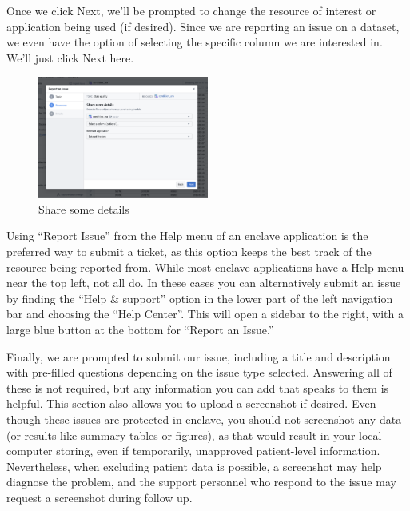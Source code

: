 \documentclass[
  letterpaper,
  DIV=11,
  numbers=noendperiod]{scrreprt}
\begin{document}
Once we click Next, we'll be prompted to change the resource of interest
or application being used (if desired). Since we are reporting an issue
on a dataset, we even have the option of selecting the specific column
we are interested in. We'll just click Next here.

\begin{figure}

{\centering \includegraphics[width=0.5\textwidth,height=\textheight]{chapters/images/support/image-05-issue-share-details.png}

}

\caption{\label{fig-support-issue-share-details}Share some details}

\end{figure}

\begin{tcolorbox}[enhanced jigsaw, rightrule=.15mm, colback=white, leftrule=.75mm, breakable, left=2mm, bottomtitle=1mm, opacityback=0, toprule=.15mm, colframe=quarto-callout-tip-color-frame, titlerule=0mm, toptitle=1mm, coltitle=black, title=\textcolor{quarto-callout-tip-color}{\faLightbulb}\hspace{0.5em}{Reporting Issues via Help Center}, bottomrule=.15mm, arc=.35mm, opacitybacktitle=0.6, colbacktitle=quarto-callout-tip-color!10!white]

Using ``Report Issue'' from the Help menu of an enclave application is
the preferred way to submit a ticket, as this option keeps the best
track of the resource being reported from. While most enclave
applications have a Help menu near the top left, not all do. In these
cases you can alternatively submit an issue by finding the ``Help \&
support'' option in the lower part of the left navigation bar and
choosing the ``Help Center''. This will open a sidebar to the right,
with a large blue button at the bottom for ``Report an Issue.''

\end{tcolorbox}

Finally, we are prompted to submit our issue, including a title and
description with pre-filled questions depending on the issue type
selected. Answering all of these is not required, but any information
you can add that speaks to them is helpful. This section also allows you
to upload a screenshot if desired. Even though these issues are
protected in enclave, you should not screenshot any data (or results
like summary tables or figures), as that would result in your local
computer storing, even if temporarily, unapproved patient-level
information. Nevertheless, when excluding patient data is possible, a
screenshot may help diagnose the problem, and the support personnel who
respond to the issue may request a screenshot during follow up.
\end{document}
